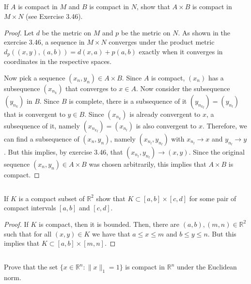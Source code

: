 \subsection{} If $A$ is compact in $M$ and $B$ is compact in $N$, show that $A \times B$ is compact in $M \times N$ (see Exercise 3.46).

\begin{proof}
Let $d$ be the metric on $M$ and $p$ be the metric on $N$. As shown in the exercise 3.46, a sequence in $M \times N$ converges under the product metric $d_p((x,y), (a,b)) = d(x,a) + p(a,b)$ exactly when it converges in coordinates in the respective spaces.

Now pick a sequence $(x_n, y_n) \in A \times B$. Since $A$ is compact, $(x_n)$ has a subsequence $(x_{n_k})$ that converges to $x \in A$.
Now consider the subsequence $(y_{n_k})$ in $B$. Since $B$ is complete, there is a subsequence of it $(y_{{n_k}_l}) = (y_{n_l})$ that is convergent to $y \in B$. Since $(x_{n_k})$ is already convergent to $x$, a subsequence of it, namely $(x_{{n_k}_l}) = (x_{n_l})$ is also convergent to $x$. Therefore, we can find a subsequence of $(x_n, y_n)$, namely $(x_{n_l}, y_{n_l})$ with $x_{n_l} \rightarrow x$ and $y_{n_l} \rightarrow y$. But this implies, by exercise 3.46, that $(x_{n_l}, y_{n_l}) \rightarrow (x,y)$. Since the original sequence $(x_n, y_n) \in A \times B$ was chosen arbitrarily, this implies that $A \times B$ is compact.

\end{proof}


\subsection{}  If $K$ is a compact subset of $\mathbb{R}^2$ show that $K \subset [a, b] \times [c, d]$ for some pair of compact intervals 
$[a, b]$ and $[c, d]$. 

\begin{proof}
If $K$ is compact, then it is bounded. Then, there are $(a,b), (m,n) \in \mathbb{R}^2$ such that for all $(x,y) \in K$ we have that $a \leq x \leq m$ and $b \leq y \leq n$. But this implies that $K \subset [a,b]\times[m,n]$.
\end{proof}

\subsection{} Prove that the set $\{x \in \mathbb{R}^n :  \|x\|_1 = 1\}$ is compact in $\mathbb{R}^n$ under the Euclidean norm. 


